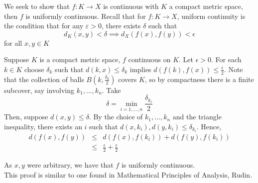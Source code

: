 \documentclass[12pt]{article}
\begin{document}
We seek to show that $f:K \to X$ is continuous with $K$ a compact metric space, then $f$ is uniformly continuous. Recall that for $f:K\to X$, uniform continuity 
is the condition that for any $\varepsilon>0$, there exists $\delta$ such that
\[
d_K(x,y) < \delta 
\implies d_X (f(x),f(y)) < \epsilon
\]
for all $x,y\in K$

Suppose $K$ is a compact metric space, $f$ continuous on $K$. Let $\epsilon > 0$. For each $k \in K$ choose 
$\delta_k$ such that $d(k,x) \leq \delta_k$ implies $d(f(k),f(x)) \leq \frac{\epsilon}{2}$. Note that the collection of balls 
$B(k, \frac{\delta_k}{2} )$ covers $K$, so by compactness there is a finite subcover,
say involving $k_1, \ldots, k_n$. Take 
\begin{equation*}
\delta = \min_{i=1,\ldots,n} \frac{\delta_{k_i}}{2}
\end{equation*}
Then, suppose $d(x,y) \leq \delta$. By the choice of $k_1,\ldots,k_n$ and the triangle inequality, there exists an $i$ such that 
$d(x,k_i),d(y,k_i) \leq \delta_{k_i}$. Hence,
\begin{eqnarray}
d(f(x),f(y)) &\leq& d(f(x),f(k_i)) + d(f(y),f(k_i)) \\
             &\leq& \frac{\epsilon}{2} + \frac{\epsilon}{2}
\end{eqnarray}

As $x,y$ were arbitrary, we have that $f$ is uniformly continuous.\\
This proof is similar to one found in Mathematical Principles of Analysis, Rudin.
\end{document}

